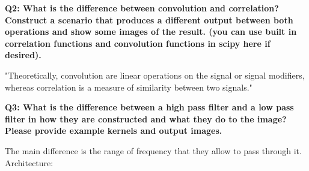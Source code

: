 \documentclass[12pt]{article}
\begin{document}
\textbf{Q2: What is the difference between convolution and correlation? Construct a scenario that
produces a different output between both operations and show some images of the result.
(you can use built in correlation functions and convolution functions in scipy here if
desired).}

"Theoretically, convolution are linear operations on the signal or signal modifiers, whereas correlation is a measure of similarity between two signals."

\textbf{Q3: What is the difference between a high pass filter and a low pass filter in how they
are constructed and what they do to the image? Please provide example kernels and output
images.}

The main difference is the range of frequency that they allow to pass through it.
Architecture:
\end{document}

